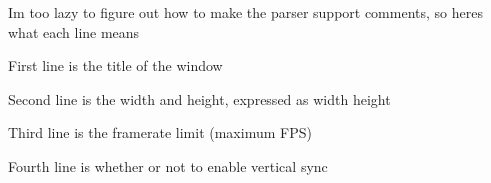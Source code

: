 I\textquotesingle{}m too lazy to figure out how to make the parser support comments, so here\textquotesingle{}s what each line means


\begin{DoxyEnumerate}
\item First line is the title of the window
\item Second line is the width and height, expressed as {\ttfamily width height}
\item Third line is the framerate limit (maximum FPS)
\item Fourth line is whether or not to enable vertical sync 
\end{DoxyEnumerate}